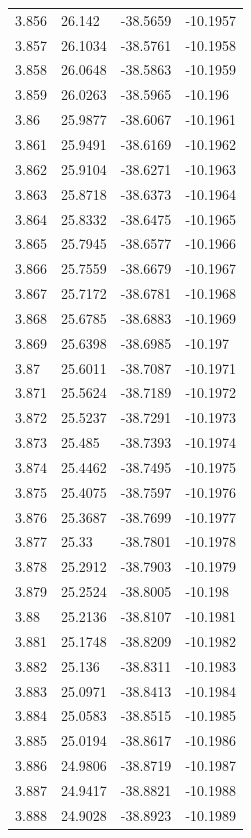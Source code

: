 \begin{tabular}{llll}
3.856 & 26.142 & -38.5659 & -10.1957 \\
3.857 & 26.1034 & -38.5761 & -10.1958 \\
3.858 & 26.0648 & -38.5863 & -10.1959 \\
3.859 & 26.0263 & -38.5965 & -10.196 \\
3.86 & 25.9877 & -38.6067 & -10.1961 \\
3.861 & 25.9491 & -38.6169 & -10.1962 \\
3.862 & 25.9104 & -38.6271 & -10.1963 \\
3.863 & 25.8718 & -38.6373 & -10.1964 \\
3.864 & 25.8332 & -38.6475 & -10.1965 \\
3.865 & 25.7945 & -38.6577 & -10.1966 \\
3.866 & 25.7559 & -38.6679 & -10.1967 \\
3.867 & 25.7172 & -38.6781 & -10.1968 \\
3.868 & 25.6785 & -38.6883 & -10.1969 \\
3.869 & 25.6398 & -38.6985 & -10.197 \\
3.87 & 25.6011 & -38.7087 & -10.1971 \\
3.871 & 25.5624 & -38.7189 & -10.1972 \\
3.872 & 25.5237 & -38.7291 & -10.1973 \\
3.873 & 25.485 & -38.7393 & -10.1974 \\
3.874 & 25.4462 & -38.7495 & -10.1975 \\
3.875 & 25.4075 & -38.7597 & -10.1976 \\
3.876 & 25.3687 & -38.7699 & -10.1977 \\
3.877 & 25.33 & -38.7801 & -10.1978 \\
3.878 & 25.2912 & -38.7903 & -10.1979 \\
3.879 & 25.2524 & -38.8005 & -10.198 \\
3.88 & 25.2136 & -38.8107 & -10.1981 \\
3.881 & 25.1748 & -38.8209 & -10.1982 \\
3.882 & 25.136 & -38.8311 & -10.1983 \\
3.883 & 25.0971 & -38.8413 & -10.1984 \\
3.884 & 25.0583 & -38.8515 & -10.1985 \\
3.885 & 25.0194 & -38.8617 & -10.1986 \\
3.886 & 24.9806 & -38.8719 & -10.1987 \\
3.887 & 24.9417 & -38.8821 & -10.1988 \\
3.888 & 24.9028 & -38.8923 & -10.1989 \\

\end{tabular}
